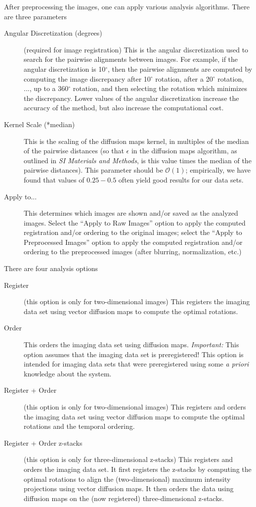 \documentclass[12pt]{article}
\newcommand{\SI}[0]{\textit{SI Materials and Methods}}
\begin{document}
After preprocessing the images, one can apply various analysis algorithms. 
%
There are three parameters
%
\begin{description}
%
\item[Angular Discretization (degrees)] (required for image registration) This is the angular discretization used to search for the pairwise alignments between images. For example, if the angular discretization is 10$^\circ$, then the pairwise alignments are computed by computing the image discrepancy after 10$^\circ$ rotation, after a 20$^\circ$ rotation, ..., up to a 360$^\circ$ rotation, and then selecting the rotation which minimizes the discrepancy. Lower values of the angular discretization increase the accuracy of the method, but also increase the computational cost. 
%
\item[Kernel Scale (*median)] This is the scaling of the diffusion maps kernel, in multiples of the median of the pairwise distances (so that $\epsilon$ in the diffusion maps algorithm, as outlined in \SI, is this value times the median of the pairwise distances). This parameter should be $\mathcal{O}(1)$; empirically, we have found that values of $0.25-0.5$ often yield good results for our data sets. 
%
\item[Apply to...]  This determines which images are shown and/or saved as the analyzed images. Select the ``Apply to Raw Images'' option to apply the computed registration and/or ordering to the original images; select the ``Apply to Preprocessed Images'' option to apply the computed registration and/or ordering to the preprocessed images (after blurring, normalization, etc.)
%
\end{description}

There are four analysis options
\begin{description}
%
\item[Register] (this option is only for two-dimensional images) This registers the imaging data set using vector diffusion maps to compute the optimal rotations. 
%
\item[Order] This orders the imaging data set using diffusion maps. {\em Important:} This option assumes that the imaging data set is preregistered! This option is intended for imaging data sets that were preregistered using some {\em a priori} knowledge about the system. 
%
\item[Register + Order] (this option is only for two-dimensional images) This registers and orders the imaging data set using vector diffusion maps to compute the optimal rotations and the temporal ordering. 
%
\item[Register + Order z-stacks] (this option is only for three-dimensional z-stacks) This registers and orders the imaging data set. It first registers the z-stacks by computing the optimal rotations to align the (two-dimensional) maximum intensity projections using vector diffusion maps.  It then orders the data using diffusion maps on the (now registered) three-dimensional z-stacks. 
%
\end{description}
\end{document}
